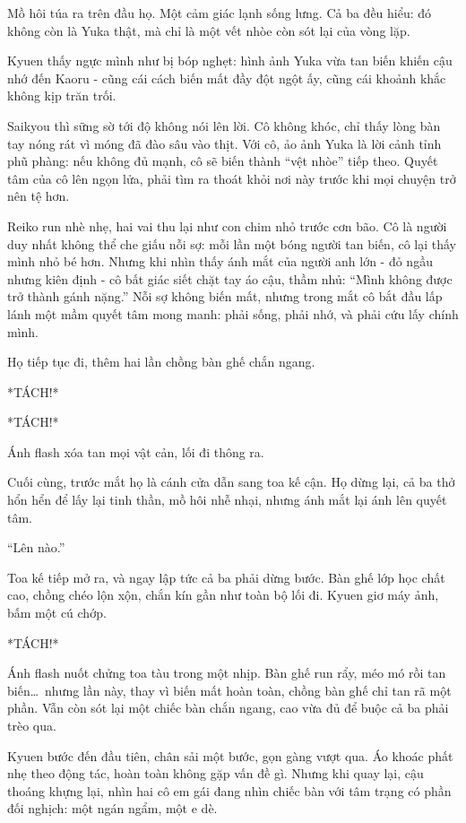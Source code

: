 \documentclass[../main.tex]{subfiles}
\begin{document}
Mồ hôi túa ra trên đầu họ. Một cảm giác lạnh sống lưng. Cả ba đều hiểu: đó không còn là Yuka thật, mà chỉ là một vết nhòe còn sót lại của vòng lặp.

Kyuen thấy ngực mình như bị bóp nghẹt: hình ảnh Yuka vừa tan biến khiến cậu nhớ đến Kaoru - cũng cái cách biến mất đầy đột ngột ấy, cũng cái khoảnh khắc không kịp trăn trối.

Saikyou thì sững sờ tới độ không nói lên lời. Cô không khóc, chỉ thấy lòng bàn tay nóng rát vì móng đã đào sâu vào thịt. Với cô, ảo ảnh Yuka là lời cảnh tỉnh phũ phàng: nếu không đủ mạnh, cô sẽ biến thành ``vệt nhòe'' tiếp theo. Quyết tâm của cô lên ngọn lửa, phải tìm ra thoát khỏi nơi này trước khi mọi chuyện trở nên tệ hơn.

Reiko run nhè nhẹ, hai vai thu lại như con chim nhỏ trước cơn bão. Cô là người duy nhất không thể che giấu nỗi sợ: mỗi lần một bóng người tan biến, cô lại thấy mình nhỏ bé hơn. Nhưng khi nhìn thấy ánh mắt của người anh lớn - đỏ ngầu nhưng kiên định - cô bất giác siết chặt tay áo cậu, thầm nhủ: ``Mình không được trở thành gánh nặng.'' Nỗi sợ không biến mất, nhưng trong mắt cô bắt đầu lấp lánh một mầm quyết tâm mong manh: phải sống, phải nhớ, và phải cứu lấy chính mình.

Họ tiếp tục đi, thêm hai lần chồng bàn ghế chắn ngang.

*TÁCH!*

*TÁCH!*

Ánh flash xóa tan mọi vật cản, lối đi thông ra.

Cuối cùng, trước mắt họ là cánh cửa dẫn sang toa kế cận. Họ dừng lại, cả ba thở hổn hển để lấy lại tinh thần, mồ hôi nhễ nhại, nhưng ánh mắt lại ánh lên quyết tâm.

``Lên nào.''

\ct

Toa kế tiếp mở ra, và ngay lập tức cả ba phải dừng bước. Bàn ghế lớp học chất cao, chồng chéo lộn xộn, chắn kín gần như toàn bộ lối đi. Kyuen giơ máy ảnh, bấm một cú chớp.

*TÁCH!*

Ánh flash nuốt chửng toa tàu trong một nhịp. Bàn ghế run rẩy, méo mó rồi tan biến\dots\ nhưng lần này, thay vì biến mất hoàn toàn, chồng bàn ghế chỉ tan rã một phần. Vẫn còn sót lại một chiếc bàn chắn ngang, cao vừa đủ để buộc cả ba phải trèo qua.

Kyuen bước đến đầu tiên, chân sải một bước, gọn gàng vượt qua. Áo khoác phất nhẹ theo động tác, hoàn toàn không gặp vấn đề gì. Nhưng khi quay lại, cậu thoáng khựng lại, nhìn hai cô em gái đang nhìn chiếc bàn với tâm trạng có phần đối nghịch: một ngán ngẩm, một e dè.
\end{document}
